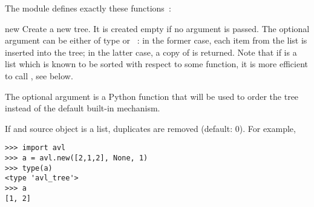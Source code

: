 \documentclass{howto}
\begin{document}
The  module defines exactly these functions~:
\begin{funcdesc}{new}{%
	}
Create a new tree.  It is created empty if no argument is passed.  The
optional  argument can be either of type  or
~: in the former case, each item from the list is
inserted into the tree; in the latter case, a copy of  is
returned.  Note that if  is a list which is known to be
sorted with respect to some  function, it is more
efficient to call
, see below.

The optional  argument is a Python function that will be
used to order the tree instead of the default built-in mechanism.

If  and source object is a list,
duplicates are removed (default: $0$). 
For example,
\begin{Verbatim}
>>> import avl
>>> a = avl.new([2,1,2], None, 1)
>>> type(a)
<type 'avl_tree'>
>>> a
[1, 2]
\end{Verbatim}
\end{funcdesc}
\end{document}
